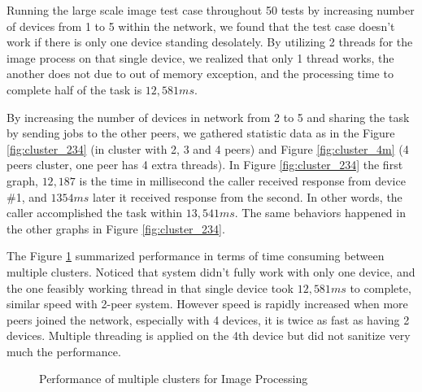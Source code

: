 \documentclass[conference]{IEEEtran}
\begin{document}
Running the large scale image test case throughout 50 tests by increasing number of devices from 1 to 5 within the network, we found that the test case doesn't work if there is only one device standing desolately. By utilizing 2 threads for the image process on that single device, we realized that only 1 thread works, the another does not due to out of memory exception, and the processing time to complete half of the task is $12,581ms$. 

By increasing the number of devices in network from 2 to 5 and sharing the task by sending jobs to the other peers, we gathered statistic data as in the Figure \ref{fig:cluster_234} (in cluster with 2, 3 and 4 peers) and Figure \ref{fig:cluster_4m} (4 peers cluster, one peer has 4 extra threads). In Figure \ref{fig:cluster_234} the first graph, $12,187$ is the time in millisecond the caller received response from device \#1, and $1354ms$ later it received response from the second. In other words, the caller accomplished the task within $13,541ms$. The same behaviors happened in the other graphs in Figure \ref{fig:cluster_234}.  
 

The Figure \ref{fig:cluster_performance} summarized performance in terms of time consuming between multiple clusters. Noticed that system didn't fully work with only one device, and the one feasibly working thread in that single device took $12,581ms$ to complete, similar speed with 2-peer system. However speed is rapidly increased when more peers joined the network, especially with 4 devices, it is twice as fast as having 2 devices. Multiple threading is applied on the 4th device but did not sanitize very much the performance. 

\begin{figure}[H]
	\hspace*{-0.35cm}
	\caption{Performance of multiple clusters for Image Processing}
	\label{fig:cluster_performance}
\end{figure}
\end{document}
